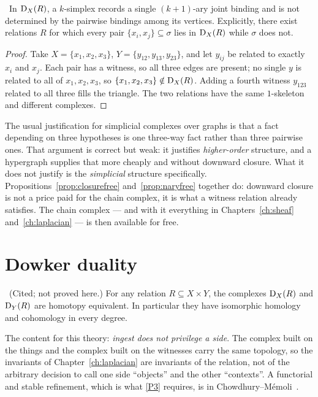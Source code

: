 \begin{proposition}\label{prop:naryfree}
\Proved\ In $\mathrm{D}_{X}(R)$, a $k$-simplex records a single $(k{+}1)$-ary joint
binding and is not determined by the pairwise bindings among its vertices.
Explicitly, there exist relations $R$ for which every pair
$\{x_i,x_j\}\subseteq\sigma$ lies in $\mathrm{D}_{X}(R)$ while $\sigma$ does not.
\end{proposition}
\begin{proof}
Take $X=\{x_1,x_2,x_3\}$, $Y=\{y_{12},y_{13},y_{23}\}$, and let $y_{ij}$ be
related to exactly $x_i$ and $x_j$. Each pair has a witness, so all three
edges are present; no single $y$ is related to all of $x_1,x_2,x_3$, so
$\{x_1,x_2,x_3\}\notin\mathrm{D}_{X}(R)$. Adding a fourth witness $y_{123}$ related
to all three fills the triangle. The two relations have the same
$1$-skeleton and different complexes.
\end{proof}

\begin{remark}\label{rem:nary}
The usual justification for simplicial complexes over graphs is that a fact
depending on three hypotheses is one three-way fact rather than three pairwise
ones. That argument is correct but weak: it justifies \emph{higher-order}
structure, and a hypergraph supplies that more cheaply and without downward
closure. What it does not justify is the \emph{simplicial} structure
specifically. Propositions~\ref{prop:closurefree} and~\ref{prop:naryfree}
together do: downward closure is not a price paid for the chain complex, it is
what a witness relation already satisfies. The chain complex --- and with it
everything in Chapters~\ref{ch:sheaf} and~\ref{ch:laplacian} --- is then
available for free.
\end{remark}

\section{Dowker duality}

\begin{theorem}[Dowker, 1952]\label{thm:dowker}
\Proved\ (Cited; not proved here.) For any relation $R\subseteq X\times Y$,
the complexes $\mathrm{D}_{X}(R)$ and $\mathrm{D}_{Y}(R)$ are homotopy equivalent. In
particular they have isomorphic homology and cohomology in every
degree.~\cite{Dowker}
\end{theorem}

The content for this theory: \emph{ingest does not privilege a side}. The
complex built on the things and the complex built on the witnesses carry the
same topology, so the invariants of Chapter~\ref{ch:laplacian} are invariants
of the relation, not of the arbitrary decision to call one side ``objects''
and the other ``contexts''. A functorial and stable refinement, which is what
\ref{P3} requires, is in Chowdhury--M\'emoli~\cite{ChowdhuryMemoli}.

